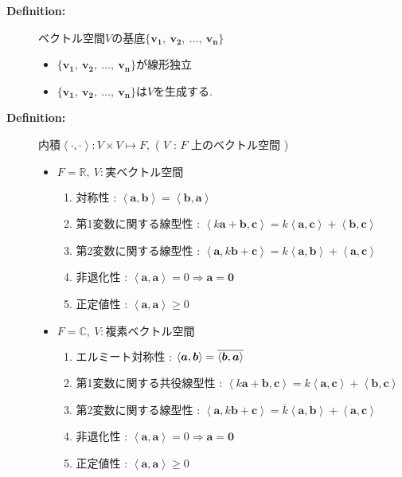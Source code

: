 \documentclass[dvipdfmx]{jsarticle}
\newcommand{\tlinner}[2]{%
    \left\langle #1, #2 \right\rangle%
}
\begin{document}
\begin{description}
    \item[\bf{Definition:}] ベクトル空間$V$の基底$\{ \bm{v_1},\ \bm{v_2},\ \dots,\ \bm{v_n} \}$
        \begin{itemize}
            \item $\{ \bm{v_1},\ \bm{v_2},\ \dots,\ \bm{v_n} \}$が線形独立
            \item $\{ \bm{v_1},\ \bm{v_2},\ \dots,\ \bm{v_n} \}$は$V$を生成する.
        \end{itemize}

    
        \item[\bf{Definition:}] 内積$\tlinner{\bm{\cdot}}{\bm{\cdot}}  : V \times V \mapsto F,$ ( $V$ : $F$ 上のベクトル空間 )
        \begin{itemize}
            \item $F = \mathbb{R},\ V : \text{実ベクトル空間}$
                \begin{enumerate}
                    \item 対称性 : $ \tlinner{\bm{a}}{\bm{b}} = \tlinner{\bm{b}}{\bm{a}}$
                    \item 第1変数に関する線型性 : $ \tlinner{k\bm{a} + \bm{b}}{\bm{c}}  = k \tlinner{\bm{a}}{\bm{c}} + \tlinner{\bm{b}}{\bm{c}}$
                    \item 第2変数に関する線型性 : $ \tlinner{\bm{a}}{k\bm{b} + \bm{c}} = k \tlinner{\bm{a}}{\bm{b}} + \tlinner{\bm{a}}{\bm{c}}$
                    \item 非退化性 : $ \tlinner{\bm{a}}{\bm{a}} = 0 \Rightarrow \bm{a} = \bm{0}$
                    \item 正定値性 : $ \tlinner{\bm{a}}{\bm{a}} \geq 0 $
                \end{enumerate}
            \item $ F = \mathbb{C},\ V : \text{複素ベクトル空間}$
                \begin{enumerate}
                    \item エルミート対称性 : $ \tlinner{\bm{a}}{\bm{b}} = \overline { \tlinner{\bm{b}}{\bm{a}} }$
                    \item 第1変数に関する共役線型性 : $ \tlinner{k\bm{a} + \bm{b}}{\bm{c}} = k \tlinner{\bm{a}}{\bm{c}} + \tlinner{\bm{b}}{\bm{c}}$
                    \item 第2変数に関する線型性 : $ \tlinner{\bm{a}}{k\bm{b} + \bm{c}} = \overline{k} \tlinner{\bm{a}}{\bm{b}} + \tlinner{\bm{a}}{\bm{c}}$
                    \item 非退化性 : $ \tlinner{\bm{a}}{\bm{a}} = 0 \Rightarrow \bm{a} = \bm{0}$
                    \item 正定値性 : $ \tlinner{\bm{a}}{\bm{a}} \geq 0 $
                \end{enumerate}
        \end{itemize}


\end{description}
\end{document}
